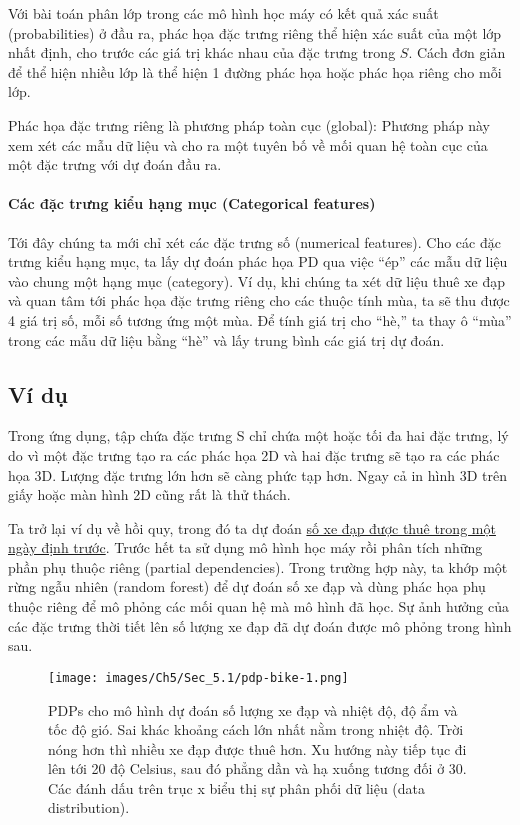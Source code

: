 Với bài toán phân lớp trong các mô hình học máy có kết quả xác suất (probabilities) ở đầu ra, phác họa đặc trưng riêng thể hiện xác suất của một lớp nhất định, cho trước các giá trị khác nhau của đặc trưng trong $S$. Cách đơn giản để thể hiện nhiều lớp là thể hiện 1 đường phác họa hoặc phác họa riêng cho mỗi lớp. 

Phác họa đặc trưng riêng là phương pháp toàn cục (global): Phương pháp này xem xét các mẫu dữ liệu và cho ra một tuyên bố về mối quan hệ toàn cục của một đặc trưng với dự đoán đầu ra.

\paragraph{Các đặc trưng kiểu hạng mục (Categorical features)} Tới đây chúng ta mới chỉ xét các đặc trưng số (numerical features). Cho các đặc trưng kiểu hạng mục, ta lấy dự đoán phác họa PD qua việc “ép” các mẫu dữ liệu vào chung một hạng mục (category). Ví dụ, khi chúng ta xét dữ liệu thuê xe đạp và quan tâm tới phác họa đặc trưng riêng cho các thuộc tính mùa, ta sẽ thu được 4 giá trị số, mỗi số tương ứng một mùa. Để tính giá trị cho “hè,” ta thay ô “mùa” trong các mẫu dữ liệu bằng ``hè'' và 
lấy trung bình các giá trị dự đoán.



\subsection{Ví dụ}
Trong ứng dụng, tập chứa đặc trưng S chỉ chứa một hoặc tối đa hai đặc trưng, lý do vì một đặc trưng tạo ra các phác họa 2D và hai đặc trưng sẽ tạo ra các phác họa 3D. Lượng đặc trưng lớn hơn sẽ càng phức tạp hơn. Ngay cả in hình 3D trên giấy hoặc màn hình 2D cũng rất là thử thách.

Ta trở lại ví dụ về hồi quy, trong đó ta dự đoán \href{chap_3.1}{số xe đạp được thuê trong một ngày định trước}. Trước hết ta sử dụng mô hình học máy rồi phân tích những phần phụ thuộc riêng (partial dependencies). Trong trường hợp này, ta khớp một rừng ngẫu nhiên (random forest) để dự đoán số xe đạp và dùng phác họa phụ thuộc riêng để mô phỏng các mối quan hệ mà mô hình đã học. Sự ảnh hưởng của các đặc trưng thời tiết lên số lượng xe đạp đã dự đoán được mô phỏng trong hình sau. 

\begin{figure*}[h!]
	\centering
	\texttt{[image: images/Ch5/Sec\_5.1/pdp-bike-1.png]}
	\label{fig:5_2}
	\caption{PDPs cho mô hình dự đoán số lượng xe đạp và nhiệt độ, độ ẩm và tốc độ gió. Sai khác khoảng cách lớn nhất nằm trong nhiệt độ. Trời nóng hơn thì nhiều xe đạp được thuê hơn. Xu hướng này tiếp tục đi lên tới 20 độ Celsius, sau đó phẳng dần và hạ xuống tương đối ở 30. Các đánh dấu trên trục x biểu thị sự phân phối dữ liệu (data distribution).}
\end{figure*}


